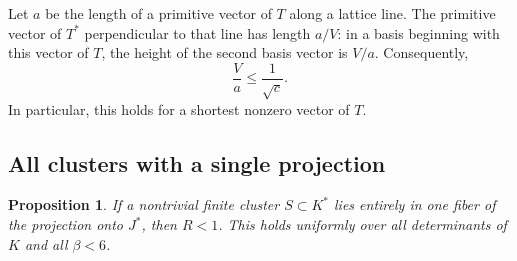 \documentclass[11pt,a4paper]{article}
\newtheorem{proposition}[theorem]{Proposition}
\theoremstyle{remark}\newtheorem{remark}[theorem]{Remark}
\begin{document}
Let $a$ be the length of a primitive vector of $T$ along a lattice line. The primitive vector of $T^*$ perpendicular to that line has length $a/V$: in a basis beginning with this vector of $T$, the height of the second basis vector is $V/a$. Consequently,
\begin{equation}\label{eq:planarspacing}
\frac Va\le\frac1{\sqrt c}.
\end{equation}
In particular, this holds for a shortest nonzero vector of $T$.

\subsection{All clusters with a single projection}

\begin{proposition}\label{prop:onefiber10}
If a nontrivial finite cluster $S\subset K^*$ lies entirely in one fiber of the projection onto $J^*$, then $R<1$. This holds uniformly over all determinants of $K$ and all $\beta<6$.
\end{proposition}
\end{document}

